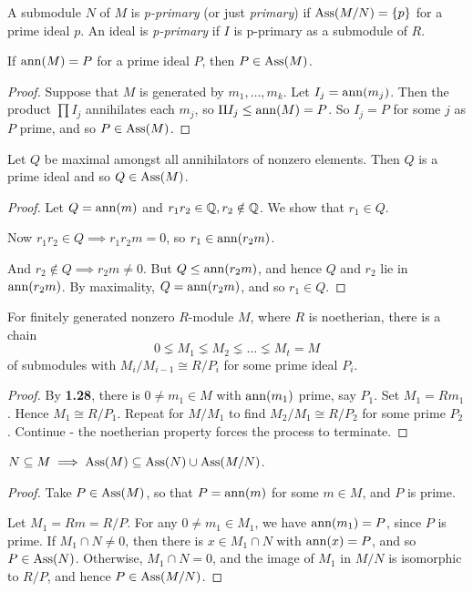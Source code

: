 \documentclass[10pt,a4paper]{article}
\begin{document}
\begin{definition}
  A submodule $N$ of $M$ is \emph{p-primary} (or just \emph{primary}) if $\operatorname{Ass}(M/N) = \{p\}$ for a prime ideal $p$. An ideal is \emph{p-primary} if $I$ is p-primary as a submodule of $R$.
\end{definition}
\begin{lemma}
  If $\operatorname{ann}(M) = P$ for a prime ideal $P$, then $P \in \operatorname{Ass}(M)$.
\end{lemma}
\begin{proof}
  Suppose that $M$ is generated by $m_1, \ldots, m_k$. Let $I_j = \operatorname{ann}(m_j)$. Then the product $\prod I_j$ annihilates each $m_j$, so $\Pi I_j \leq \operatorname{ann}(M) = P$. So $I_j = P$ for some $j$ as $P$ prime, and so $P \in \operatorname{Ass}(M)$.
\end{proof}
\begin{lemma}
  Let $Q$ be maximal amongst all annihilators of nonzero elements. Then $Q$ is a prime ideal and so $Q \in \operatorname{Ass}(M)$.
\end{lemma}
\begin{proof}
  Let $Q = \operatorname{ann}(m)$ and $r_1r_2 \in \mathbb{Q}, r_2 \notin \mathbb{Q}$. We show that $r_1 \in Q$.

  Now $r_1r_2 \in Q \implies r_1r_2m = 0$, so $r_1 \in \operatorname{ann}(r_2m)$.

  And $r_2 \notin Q \implies r_2m\neq 0$. But $Q \leq \operatorname{ann}(r_2m)$, and hence $Q$ and $r_2$ lie in $\operatorname{ann}(r_2m)$. By maximality, $Q = \operatorname{ann}(r_2m)$, and so $r_1 \in Q$.
\end{proof}
\begin{lemma}
  For finitely generated nonzero $R$-module $M$, where $R$ is noetherian, there is a chain
  \[ 0\lneq M_1 \lneq M_2 \lneq \ldots \lneq M_t = M\]
  of submodules with $M_i/M_{i-1} \cong R/P_i$ for some prime ideal $P_i$.
\end{lemma}
\begin{proof}
  By \textbf{1.28}, there is $0\neq m_1 \in M$ with $\operatorname{ann}(m_1)$ prime, say $P_1$. Set $M_1 = Rm_1$. Hence $M_1 \cong R/P_1$. Repeat for $M/M_1$ to find $M_2/M_1 \cong R/P_2$ for some prime $P_2$. Continue - the noetherian property forces the process to terminate.
\end{proof}
\begin{lemma}
  $N \subseteq M \implies \operatorname{Ass}(M) \subseteq \operatorname{Ass}(N) \cup \operatorname{Ass}(M/N)$.
\end{lemma}
\begin{proof}
  Take $P \in \operatorname{Ass}(M)$, so that $P = \operatorname{ann}(m)$ for some $m \in M$, and $P$ is prime.

  Let $M_1 = Rm = R/P$. For any $0 \neq m_1 \in M_1$, we have $\operatorname{ann}(m_1) = P$, since $P$ is prime. If $M_1 \cap N \neq 0$, then there is $x \in M_1 \cap N$ with $\operatorname{ann}(x) = P$, and so $P \in \operatorname{Ass}(N)$. Otherwise, $M_1 \cap N = 0$, and the image of $M_1$ in $M/N$ is isomorphic to $R/P$, and hence $P \in \operatorname{Ass}(M/N)$.
\end{proof}
\end{document}
